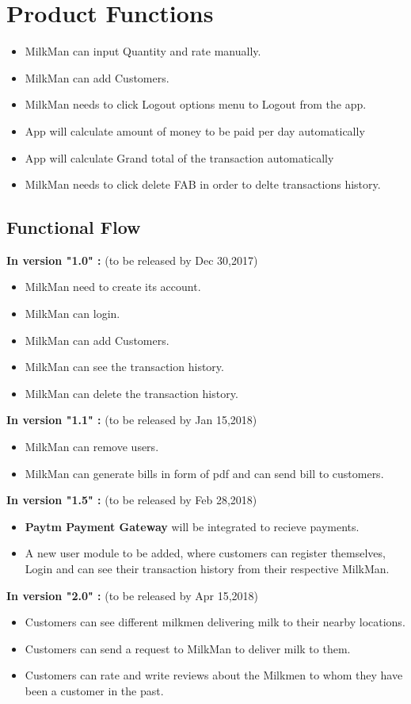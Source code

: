 \section{Product Functions}
\begin{itemize}
	\item MilkMan can input Quantity and rate manually.
	\item MilkMan can add Customers.
	\item MilkMan needs to click Logout options menu to Logout from the app.
	\item App will calculate amount of money to be paid per day automatically
	\item App will calculate Grand total of the transaction automatically
	\item MilkMan needs to click delete FAB in order to delte transactions history.\\
	
\end{itemize}
\subsection{Functional Flow}
\textbf{In version "1.0"  :} (to be released by Dec 30,2017)
\begin{itemize}
	\item MilkMan need to create its account.
	\item MilkMan can login.
	\item MilkMan can add Customers.
	\item MilkMan can see the transaction history.
	\item MilkMan can delete the transaction history.
\end{itemize}
\textbf{In version "1.1" :} (to be released by Jan 15,2018)
\begin{itemize}
	\item MilkMan can remove users.
	\item MilkMan can generate bills in form of pdf and can send bill to customers.\\
\end{itemize}
\textbf{In version "1.5" :} (to be released by Feb 28,2018)
\begin{itemize}
	\item \textbf{Paytm Payment Gateway} will be integrated to recieve payments.
	\item A new user module to be added, where customers can register themselves, Login and can see their transaction history from their respective MilkMan.
\end{itemize}
\textbf{In version "2.0" :} (to be released by Apr 15,2018)
\begin{itemize}
	\item Customers can see different milkmen delivering milk to their nearby locations.
	\item Customers can send a request to MilkMan to deliver milk to them.
	\item Customers can rate and write reviews about the Milkmen to whom they have been a customer in the past.   
\end{itemize}
